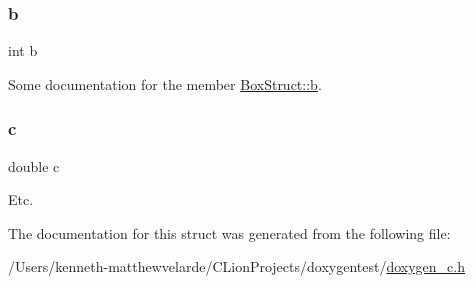 \subsubsection{\texorpdfstring{b}{b}}
{\footnotesize\ttfamily int b}

Some documentation for the member \mbox{\hyperlink{struct_box_struct__struct_a148e3876077787926724625411d6e7a9}{Box\+Struct\+::b}}. \mbox{\label{struct_box_struct__struct_a2c09e929a6ea340fc9653cca414b11d3}} 
\subsubsection{\texorpdfstring{c}{c}}
{\footnotesize\ttfamily double c}

Etc. 

The documentation for this struct was generated from the following file\+:\begin{DoxyCompactItemize}
\item 
/\+Users/kenneth-\/matthewvelarde/\+C\+Lion\+Projects/doxygentest/\mbox{\hyperlink{doxygen__c_8h}{doxygen\+\_\+c.\+h}}\end{DoxyCompactItemize}
